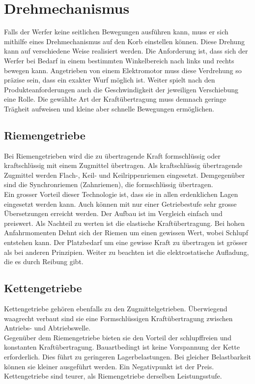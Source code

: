 \section{Drehmechanismus}
Falls der Werfer keine seitlichen Bewegungen ausführen kann, muss er sich mithilfe eines Drehmechanismus auf den Korb einstellen können. Diese Drehung kann auf verschiedene Weise realisiert werden. Die Anforderung ist, dass sich der Werfer bei Bedarf in einem bestimmten Winkelbereich nach links und rechts bewegen kann. Angetrieben von einem Elektromotor muss diese Verdrehung so präzise sein, dass ein exakter Wurf möglich ist. Weiter spielt nach den Produkteanforderungen auch die Geschwindigkeit der jeweiligen Verschiebung eine Rolle. Die gewählte Art der Kraftübertragung muss demnach geringe Trägheit aufweisen und kleine aber schnelle Bewegungen ermöglichen. 
 
\subsection{Riemengetriebe}
Bei Riemengetrieben wird die zu übertragende Kraft formschlüssig oder kraftschlüssig mit einem Zugmittel übertragen. Als kraftschlüssig übertragende Zugmittel werden Flach-, Keil- und Keilrippenriemen eingesetzt. Demgegenüber sind die Synchronriemen (Zahnriemen), die formschlüssig übertragen. \\
Ein grosser Vorteil dieser Technologie ist, dass sie in allen erdenklichen Lagen eingesetzt werden kann. Auch können mit nur einer Getriebestufe sehr grosse Übersetzungen erreicht werden. Der Aufbau ist im Vergleich einfach und preiswert. Als Nachteil zu werten ist die elastische Kraftübertragung. Bei hohen Anfahrmomenten Dehnt sich der Riemen um einen gewissen Wert, wobei Schlupf entstehen kann. Der Platzbedarf um eine gewisse Kraft zu übertragen ist grösser als bei anderen Prinzipien. Weiter zu beachten ist die elektrostatische Aufladung, die es durch Reibung gibt. 
 
\subsection{Kettengetriebe}
Kettengetriebe gehören ebenfalls zu den Zugmittelgetrieben. Überwiegend waagrecht verbaut sind sie eine Formschlüssigen Kraftübertragung zwischen Antriebs- und Abtriebswelle. \\
Gegenüber dem Riemengetriebe bieten sie den Vorteil der schlupffreien und konstanten Kraftübertragung. Bauartbedingt ist keine Vorspannung der Kette erforderlich. Dies führt zu geringeren Lagerbelastungen. Bei gleicher Belastbarkeit können sie kleiner ausgeführt werden. Ein Negativpunkt ist der Preis. Kettengetriebe sind teurer, als Riemengetriebe derselben Leistungsstufe.

